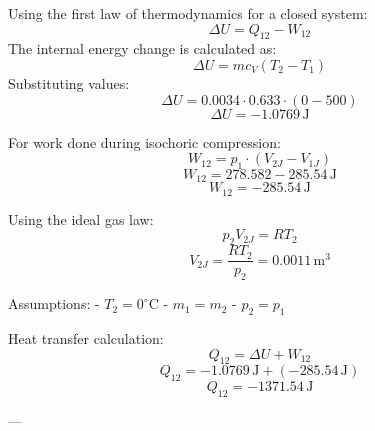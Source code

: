Using the first law of thermodynamics for a closed system:  
\[
\Delta U = Q_{12} - W_{12}
\]  
The internal energy change is calculated as:  
\[
\Delta U = m c_V (T_2 - T_1)
\]  
Substituting values:  
\[
\Delta U = 0.0034 \cdot 0.633 \cdot (0 - 500)
\]  
\[
\Delta U = -1.0769 \, \text{J}
\]  

For work done during isochoric compression:  
\[
W_{12} = p_1 \cdot (V_{2J} - V_{1J})
\]  
\[
W_{12} = 278.582 - 285.54 \, \text{J}
\]  
\[
W_{12} = -285.54 \, \text{J}
\]  

Using the ideal gas law:  
\[
p_2 V_{2J} = R T_2
\]  
\[
V_{2J} = \frac{R T_2}{p_2} = 0.0011 \, \text{m}^3
\]  

Assumptions:  
- \( T_2 = 0^\circ \text{C} \)  
- \( m_1 = m_2 \)  
- \( p_2 = p_1 \)  

Heat transfer calculation:  
\[
Q_{12} = \Delta U + W_{12}
\]  
\[
Q_{12} = -1.0769 \, \text{J} + (-285.54 \, \text{J})
\]  
\[
Q_{12} = -1371.54 \, \text{J}
\]  

---